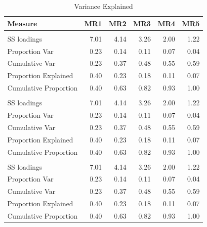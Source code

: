 \documentclass{article}\usepackage[]{graphicx}\usepackage[]{color}
\newenvironment{knitrout}{}{} %
\begin{document}
\begin{knitrout}
\begin{table}
\caption{\label{tab:unnamed-chunk-12}Variance Explained}
\centering
\begin{tabular}[t]{lrrrrr}
\toprule
Measure & MR1 & MR2 & MR3 & MR4 & MR5\\
\midrule
\addlinespace[0.3em]
\multicolumn{6}{l}{\textbf{Unrotated}}\\
\hspace{1em}SS loadings & 7.01 & 4.14 & 3.26 & 2.00 & \vphantom{2} 1.22\\
\hspace{1em}Proportion Var & 0.23 & 0.14 & 0.11 & 0.07 & \vphantom{2} 0.04\\
\hspace{1em}Cumulative Var & 0.23 & 0.37 & 0.48 & 0.55 & \vphantom{2} 0.59\\
\hspace{1em}Proportion Explained & 0.40 & 0.23 & 0.18 & 0.11 & \vphantom{2} 0.07\\
\hspace{1em}Cumulative Proportion & 0.40 & 0.63 & 0.82 & 0.93 & \vphantom{2} 1.00\\
\addlinespace[0.3em]
\multicolumn{6}{l}{\textbf{Varimax}}\\
\hspace{1em}SS loadings & 7.01 & 4.14 & 3.26 & 2.00 & \vphantom{1} 1.22\\
\hspace{1em}Proportion Var & 0.23 & 0.14 & 0.11 & 0.07 & \vphantom{1} 0.04\\
\hspace{1em}Cumulative Var & 0.23 & 0.37 & 0.48 & 0.55 & \vphantom{1} 0.59\\
\hspace{1em}Proportion Explained & 0.40 & 0.23 & 0.18 & 0.11 & \vphantom{1} 0.07\\
\hspace{1em}Cumulative Proportion & 0.40 & 0.63 & 0.82 & 0.93 & \vphantom{1} 1.00\\
\addlinespace[0.3em]
\multicolumn{6}{l}{\textbf{Oblimin}}\\
\hspace{1em}SS loadings & 7.01 & 4.14 & 3.26 & 2.00 & 1.22\\
\hspace{1em}Proportion Var & 0.23 & 0.14 & 0.11 & 0.07 & 0.04\\
\hspace{1em}Cumulative Var & 0.23 & 0.37 & 0.48 & 0.55 & 0.59\\
\hspace{1em}Proportion Explained & 0.40 & 0.23 & 0.18 & 0.11 & 0.07\\
\hspace{1em}Cumulative Proportion & 0.40 & 0.63 & 0.82 & 0.93 & 1.00\\
\bottomrule
\end{tabular}
\end{table}


\end{knitrout}
\end{document}
